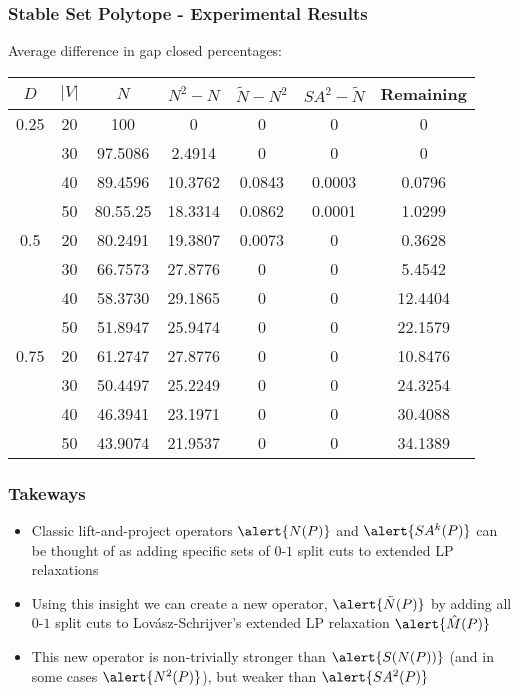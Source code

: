 \documentclass{beamer}
\begin{document}
\begin{frame}
\frametitle{Stable Set Polytope - Experimental Results}
\centering
Average difference in gap closed percentages:

\begin{tabular}{c c | c c c c c}
\hline
\rule{0pt}{4ex}$D$ &$|V|$ & $N$ & $N^2 - N$ & $\tilde{N} - N^2$ & $SA^2 - \tilde{N}$ & Remaining \\ \hline
0.25 & 20 & 100 & 0 & 0 & 0 & 0 \\ 
 & 30 & 97.5086 & 2.4914 & 0 & 0 & 0 \\ 
& 40 & 89.4596 & \alert{10.3762} & \alert{0.0843} & \alert{0.0003 }& 0.0796 \\ 
& 50 & 80.55.25 & \alert{18.3314} & \alert{0.0862} & \alert{0.0001} & 1.0299 \\ \hline
0.5 & 20 & 80.2491 & 19.3807 & 0.0073 & 0 & 0.3628 \\
& 30 & 66.7573 & 27.8776 & 0 & 0 & 5.4542 \\
& 40 & 58.3730 & 29.1865 & 0 & 0 & 12.4404 \\
& 50 & 51.8947 & 25.9474 & 0 & 0 & 22.1579 \\ \hline
0.75 & 20 & 61.2747 & 27.8776 & 0 & 0 & 10.8476 \\
& 30 & 50.4497 & 25.2249 & 0 & 0 & 24.3254 \\
& 40 & 46.3941 & 23.1971 & 0 & 0 & 30.4088 \\
& 50 & 43.9074 & 21.9537 & 0 & 0 & 34.1389 \\ \hline
\end{tabular}
\end{frame}

\begin{frame}
\frametitle{Takeways}
\begin{itemize}
\item Classic lift-and-project operators $\alert{N(P)}$ and $\alert{SA^k(P)}$ can be thought of as adding specific sets of $0$-$1$ split cuts to extended LP relaxations
\item Using this insight we can create a new operator, $\alert{\tilde{N}(P)}$ by adding all $0$-$1$ split cuts to Lov\'asz-Schrijver's extended LP relaxation $\alert{\hat{M}(P)}$
\item This new operator is non-trivially stronger than $\alert{S(N(P))}$ (and in some cases $\alert{N^2(P)}$), but weaker than $\alert{SA^2(P)}$
\end{itemize}
\end{frame}
\end{document}
